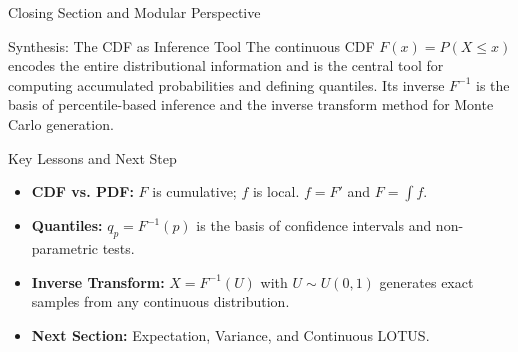 \documentclass[aspectratio=169,xcolor={dvipsnames,table}]{beamer}
\begin{document}
\begin{frame}{Closing Section and Modular Perspective}
	\vspace{-0.2cm}
	\begin{block}{Synthesis: The CDF as Inference Tool}
		\scriptsize
		The continuous CDF $F(x) = P(X \le x)$ encodes the entire distributional information and is the central tool for computing accumulated probabilities and defining quantiles. Its inverse $F^{-1}$ is the basis of percentile-based inference and the inverse transform method for Monte Carlo generation.
	\end{block}
	\vspace{0.05cm}
	\pause
	\begin{alertblock}{Key Lessons and Next Step}
		\begin{itemize}\itemsep=0.05cm
			\item \textbf{CDF vs. PDF:} $F$ is cumulative; $f$ is local. $f = F'$ and $F = \int f$.
			\item \textbf{Quantiles:} $q_{p} = F^{-1}(p)$ is the basis of confidence intervals and non-parametric tests.
			\item \textbf{Inverse Transform:} $X = F^{-1}(U)$ with $U \sim U(0, 1)$ generates exact samples from any continuous distribution.
			\item \textbf{Next Section:} \textcolor{TecRojo}{Expectation, Variance, and Continuous LOTUS}.
		\end{itemize}
	\end{alertblock}
\end{frame}
\end{document}
